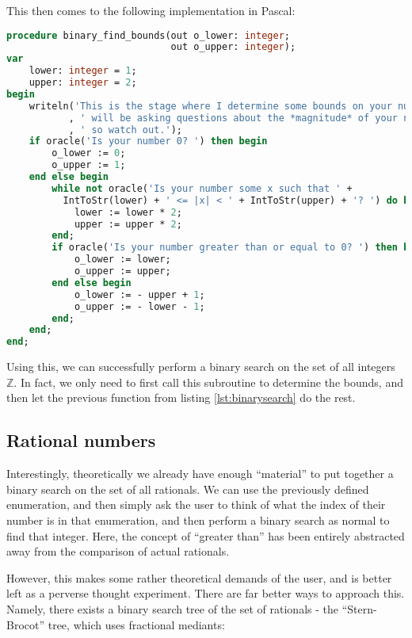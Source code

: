 \documentclass[fleqn,a4paper,11pt]{article}
\begin{document}
    This then comes to the following implementation in Pascal:

\begin{lstlisting}[language=Pascal, caption=Bound-finding subroutine in Pascal]
procedure binary_find_bounds(out o_lower: integer;
                             out o_upper: integer);
var
    lower: integer = 1;
    upper: integer = 2;
begin
    writeln('This is the stage where I determine some bounds on your number. I'
           , ' will be asking questions about the *magnitude* of your number,'
           , ' so watch out.');
    if oracle('Is your number 0? ') then begin
        o_lower := 0;
        o_upper := 1;
    end else begin
        while not oracle('Is your number some x such that ' +
          IntToStr(lower) + ' <= |x| < ' + IntToStr(upper) + '? ') do begin
            lower := lower * 2;
            upper := upper * 2;
        end;
        if oracle('Is your number greater than or equal to 0? ') then begin
            o_lower := lower;
            o_upper := upper;
        end else begin
            o_lower := - upper + 1;
            o_upper := - lower - 1;
        end;
    end;
end;
\end{lstlisting}

    Using this, we can successfully perform a binary search on the set of all
    integers \(\mathbb{Z}\). In fact, we only need to first call this subroutine
    to determine the bounds, and then let the previous function from listing
    \ref{lst:binarysearch} do the rest.

    \subsection{Rational numbers}

    Interestingly, theoretically we already have enough ``material'' to put
    together a binary search on the set of all rationals. We can use the
    previously defined enumeration, and then simply ask the user to think of
    what the index of their number is in that enumeration, and then perform a
    binary search as normal to find that integer. Here, the concept of ``greater
    than'' has been entirely abstracted away from the comparison of actual
    rationals.

    However, this makes some rather theoretical demands of the user, and is
    better left as a perverse thought experiment. There are far better ways to
    approach this. Namely, there exists a binary search tree of the set of
    rationals - the ``Stern-Brocot'' tree, which uses fractional mediants:
\end{document}

